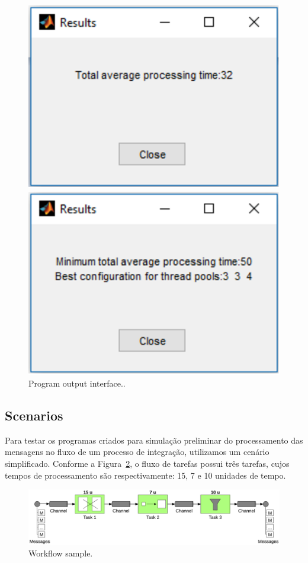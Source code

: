 %
\begin{figure}[h]
\begin{minipage}[c]{0.49\linewidth}
\centering
 \includegraphics[width=0.8\linewidth]{./figs/outputs_FIFO.eps}
\end{minipage}
\begin{minipage}[c]{0.49\linewidth}
\centering
\includegraphics[width=0.8\linewidth]{./figs/outputs_PSO.eps}
\end{minipage}
\caption{Program output interface..}
\label{fig:outputs}
\end{figure}
\subsection{Scenarios}
\label{subsec:scenarios}
Para testar os programas criados para simulação preliminar do processamento das mensagens no fluxo de um processo de integração, utilizamos um cenário simplificado. Conforme a Figura~\ref{fig:workflow}, o fluxo de tarefas possui três tarefas, cujos tempos de processamento são respectivamente: 15, 7 e 10 unidades de tempo.
\begin{figure}[h]
\centering
 \includegraphics[width=1\linewidth]{./figs/workflow.eps}
 \caption{Workflow sample.}
\label{fig:workflow}
\end{figure}

